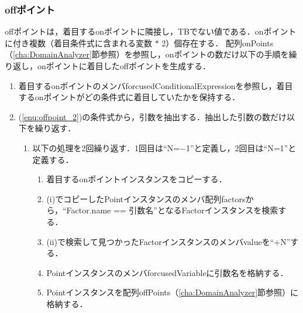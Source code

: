 \documentclass[uplatex, report, a4j, 10pt]{jsbook}
\begin{document}
\subsubsection{offポイント}
offポイントは，着目するonポイントに隣接し，TBでない値である．onポイントに付き複数（着目条件式に含まれる変数 $*$ 2）個存在する．
配列onPoints（\ref{cha:DomainAnalyzer}節参照）を参照し，onポイントの数だけ以下の手順を繰り返し，onポイントに着目したoffポイントを生成する．
\begin{enumerate}
  \item\label{enu:offpoint_2} 着目するonポイントのメンバforcusedConditionalExpressionを参照し，着目するonポイントがどの条件式に着目していたかを保持する．
  \item (\ref{enu:offpoint_2})の条件式から，引数を抽出する．抽出した引数の数だけ以下を繰り返す．
        \begin{enumerate}
          \item 以下の処理を2回繰り返す．1回目は“N=$-$1”と定義し，2回目は“N=1”と定義する．
                \begin{enumerate}
                  \item\label{enu:offpoint_3} 着目するonポイントインスタンスをコピーする．
                  \item\label{enu:offpoint_1} (i)でコピーしたPointインスタンスのメンバ配列factorsから，“Factor.name == 引数名”となるFactorインスタンスを検索する．
                  \item (ii)で検索して見つかったFactorインスタンスのメンバvalueを“+N”する．
                  \item PointインスタンスのメンバforcusedVariableに引数名を格納する．
                  \item Pointインスタンスを配列offPoints（\ref{cha:DomainAnalyzer}節参照）に格納する．
                \end{enumerate}
        \end{enumerate}
\end{enumerate}
\end{document}
